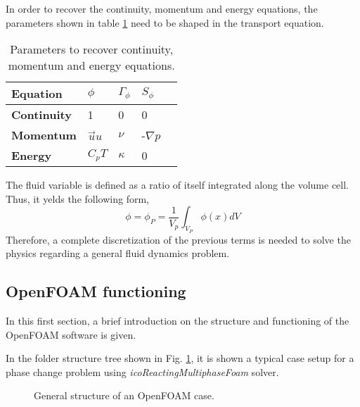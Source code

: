 \noindent In order to recover the continuity, momentum and energy equations, the parameters shown in table \ref{3.1tab} need to be shaped in the transport equation.
\begin{table}[h!]
	\begin{tabular}{@{}lllll@{}}
		\toprule[1pt]
		\textbf{Equation} & \textbf{$\phi$} & \textbf{$\Gamma_{\phi}$} & \textbf{$S_{\phi}$}  \\ \midrule[2pt]
		\textbf{Continuity} & 1 & 0 & 0  \\
		\textbf{Momentum} & $\vec{u}u$ & $\nu$ & -$\nabla p$\\
		\textbf{Energy} & $C_{p}T$ & $\kappa$ & 0\\ \bottomrule[1pt]		
	\end{tabular}
	\centering
	\caption{Parameters to recover continuity, momentum and energy equations.}	
	\label{3.1tab}
\end{table}
\newline
The fluid variable is defined as a ratio of itself integrated along the volume cell. Thus, it yelds the following form,
\begin{equation}
	\phi=\phi_{P}=\frac{1}{V_{p}} \int_{V_{P}} \phi(x) d V
	\label{3.2}
\end{equation}
Therefore, a complete discretization of the previous terms is needed to solve the physics regarding a general fluid dynamics problem.
\subsection{OpenFOAM functioning}
\setlength{\parindent}{0.5cm} In this first section, a brief introduction on the structure and functioning of the OpenFOAM software is given.

\noindent In the folder structure tree shown in Fig. \ref{3.1fig},  it is shown a typical case setup for a phase change problem using \textit{icoReactingMultiphaseFoam} solver.

\begin{figure}[h!]
	\centering
	\caption{General structure of an OpenFOAM case.}
	\label{3.1fig}
\end{figure}

